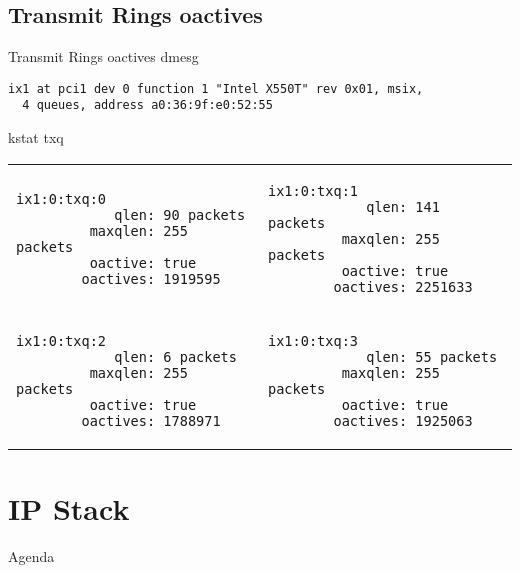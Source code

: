 \documentclass[14pt]{beamer}
\begin{document}
\subsection{Transmit Rings oactives}
\begin{frame}[fragile]{Transmit Rings oactives}
dmesg
\scriptsize
\begin{verbatim}
ix1 at pci1 dev 0 function 1 "Intel X550T" rev 0x01, msix,
  4 queues, address a0:36:9f:e0:52:55
\end{verbatim}
\normalsize
kstat txq
\\
\vspace{.3cm}
\scriptsize
\begin{tabular}{ll}
  \begin{minipage}{4.5cm}
  \begin{verbatim}
ix1:0:txq:0
            qlen: 90 packets
         maxqlen: 255 packets
         oactive: true
        oactives: 1919595
  \end{verbatim}
  \end{minipage}
  &
  \begin{minipage}{4.5cm}
  \begin{verbatim}
ix1:0:txq:1
            qlen: 141 packets
         maxqlen: 255 packets
         oactive: true
        oactives: 2251633
  \end{verbatim}
  \end{minipage}
  \\
  \begin{minipage}{4.5cm}
  \begin{verbatim}
ix1:0:txq:2
            qlen: 6 packets
         maxqlen: 255 packets
         oactive: true
        oactives: 1788971
  \end{verbatim}
  \end{minipage}
  &
  \begin{minipage}{4.5cm}
  \begin{verbatim}
ix1:0:txq:3
            qlen: 55 packets
         maxqlen: 255 packets
         oactive: true
        oactives: 1925063
  \end{verbatim}
  \end{minipage}
  \\
\end{tabular}
\end{frame}

\section{IP Stack}
\begin{frame}{Agenda}
\tableofcontents[currentsection]
\end{frame}
\end{document}
